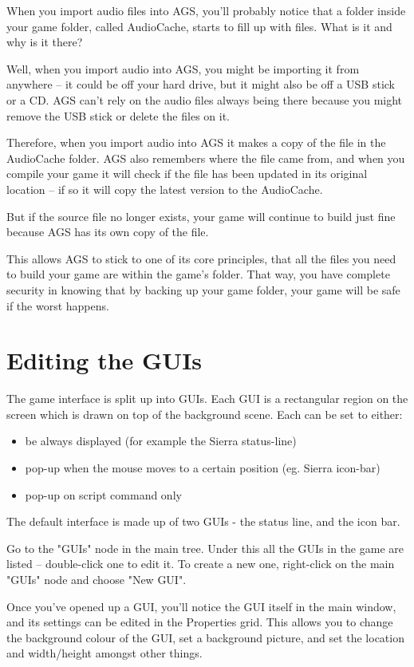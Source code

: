 When you import audio files into AGS, you'll probably notice that a folder
inside your game folder, called AudioCache, starts to fill up with files. What
is it and why is it there?

Well, when you import audio into AGS, you might be importing it from anywhere --
it could be off your hard drive, but it might also be off a USB stick or a CD.
AGS can't rely on the audio files always being there because you might remove
the USB stick or delete the files on it.

Therefore, when you import audio into AGS it makes a copy of the file in the AudioCache
folder. AGS also remembers where the file came from, and when you compile your game
it will check if the file has been updated in its original location -- if so it will
copy the latest version to the AudioCache.

But if the source file no longer exists, your game will continue to build just fine
because AGS has its own copy of the file.

This allows AGS to stick to one of its core principles, that all the files you need
to build your game are within the game's folder. That way, you have complete security
in knowing that by backing up your game folder, your game will be safe if the worst happens.


\section{Editing the GUIs}%

The game interface is split up into GUIs. Each GUI is a
rectangular region on the screen which is drawn on top of the background
scene. Each can be set to either:
\begin{itemize}
\item be always displayed (for example the Sierra status-line)
\item pop-up when the mouse moves to a certain position (eg. Sierra icon-bar)
\item pop-up on script command only
\end{itemize}
The default interface is made up of two GUIs - the status line, and the
icon bar.

Go to the "GUIs" node in the main tree. Under this all the GUIs in the game
are listed -- double-click one to edit it. To create a new one, right-click
on the main "GUIs" node and choose "New GUI".

Once you've opened up a GUI, you'll notice the GUI itself in the main window,
and its settings can be edited in the Properties grid. This allows you to change the
background colour of the GUI, set a background picture, and set the
location and width/height amongst other things.

